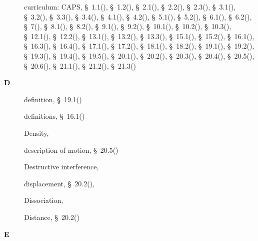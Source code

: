 \begin{multicols}{2}
{\begin{description}
	  \item[] \noindent\raggedright curriculum: CAPS,  \S~1.1(\pageref{m38708}),  \S~1.2(\pageref{m38706}),  \S~2.1(\pageref{m38736}),  \S~2.2(\pageref{m38734}),  \S~2.3(\pageref{m38730}),  \S~3.1(\pageref{m38756}),  \S~3.2(\pageref{m38745}),  \S~3.3(\pageref{m38753}),  \S~3.4(\pageref{m38741}),  \S~4.1(\pageref{m38760}),  \S~4.2(\pageref{m38757}),  \S~5.1(\pageref{m38704}),  \S~5.2(\pageref{m38701}),  \S~6.1(\pageref{m38801}),  \S~6.2(\pageref{m38802}),  \S~7(\pageref{m38806}),  \S~8.1(\pageref{m38782}),  \S~8.2(\pageref{m38783}),  \S~9.1(\pageref{m38799}),  \S~9.2(\pageref{m38800}),  \S~10.1(\pageref{m38777}),  \S~10.2(\pageref{m38778}),  \S~10.3(\pageref{m38779}),  \S~12.1(\pageref{m38709}),  \S~12.2(\pageref{m38711}),  \S~13.1(\pageref{m38721}),  \S~13.2(\pageref{m38726}),  \S~13.3(\pageref{m38727}),  \S~15.1(\pageref{m38780}),  \S~15.2(\pageref{m38781}),  \S~16.1(\pageref{m38771}),  \S~16.3(\pageref{m38773}),  \S~16.4(\pageref{m38776}),  \S~17.1(\pageref{m38720}),  \S~17.2(\pageref{m38719}),  \S~18.1(\pageref{m38717}),  \S~18.2(\pageref{m38712}),  \S~19.1(\pageref{m38812}),  \S~19.2(\pageref{m38813}),  \S~19.3(\pageref{m38815}),  \S~19.4(\pageref{m38816}),  \S~19.5(\pageref{m38819}),  \S~20.1(\pageref{m38787}),  \S~20.2(\pageref{m38788}),  \S~20.3(\pageref{m38791}),  \S~20.4(\pageref{m38794}),  \S~20.5(\pageref{m38795}),  \S~20.6(\pageref{m38796}),  \S~21.1(\pageref{m38784}),  \S~21.2(\pageref{m38785}),  \S~21.3(\pageref{m38786})
	  \vspace{.3cm}
	  \item[{\large \bfseries D}]\noindent\raggedright
	  definition,  \S~19.1(\pageref{m38812})
	  \item[] \noindent\raggedright definitions,  \S~16.1(\pageref{m38771})
	  \item[] \noindent\raggedright Density,  \pageref{id2412522}
	  \item[] \noindent\raggedright description of motion,  \S~20.5(\pageref{m38795})
	  \item[] \noindent\raggedright Destructive interference,  \pageref{id2436357}
	  \item[] \noindent\raggedright displacement,  \S~20.2(\pageref{m38788}),  \pageref{id2527121}
	  \item[] \noindent\raggedright Dissociation,  \pageref{id2490327}
	  \item[] \noindent\raggedright Distance,  \S~20.2(\pageref{m38788})
	  \vspace{.3cm}
	  \item[{\large \bfseries E}]\noindent\raggedright

\end{description}}
\end{multicols}
